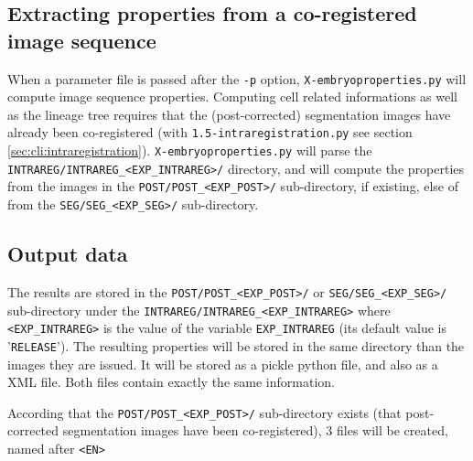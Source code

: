 \subsection{Extracting properties from a co-registered image sequence}

When a parameter file is passed after the \texttt{-p} option, \texttt{X-embryoproperties.py} will compute image sequence properties.
Computing cell related informations as well as the lineage tree requires that the (post-corrected) segmentation images have already been co-registered (with \texttt{1.5-intraregistration.py} see section \ref{sec:cli:intraregistration}). 
\texttt{X-embryoproperties.py} will parse the \texttt{INTRAREG/INTRAREG\_<EXP\_INTRAREG>/} directory, and will compute the properties from the images in the \texttt{POST/POST\_<EXP\_POST>/} sub-directory, if existing, else of from the \texttt{SEG/SEG\_<EXP\_SEG>/} sub-directory.



\subsection{Output data}

The results are stored in the \texttt{POST/POST\_<EXP\_POST>/} or
\texttt{SEG/SEG\_<EXP\_SEG>/} sub-directory under the
\texttt{INTRAREG/INTRAREG\_<EXP\_INTRAREG>} where
\texttt{<EXP\_INTRAREG>} is the value of the variable
\texttt{EXP\_INTRAREG} (its default value is '\texttt{RELEASE}').  
The resulting properties will be stored in the same directory than the images they are issued. It will be stored as a pickle python file, and also as a XML file. Both files contain exactly the same information.

According that the \texttt{POST/POST\_<EXP\_POST>/} sub-directory exists (that post-corrected segmentation images have been co-registered), 3 files will be created, named after \texttt{<EN>}

\mbox{}

